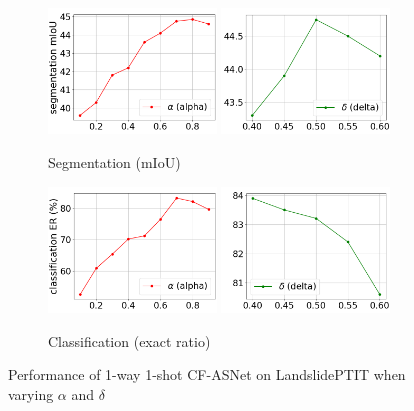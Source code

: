 \documentclass{ieeeaccess}
\begin{document}
\begin{figure}
  \centering
  \begin{subfigure}{\columnwidth}
  \includegraphics[width=0.49\textwidth]{Fig/alpha_iou_3.png}
  \includegraphics[width=0.49\textwidth]{Fig/delta_iou.png}
  \caption{Segmentation (mIoU)}
  \label{fig:alpha-a}
  \end{subfigure}
  \hfill
  \begin{subfigure}{\columnwidth}
  \includegraphics[width=0.49\textwidth]{Fig/alpha_er_3.png}
  \includegraphics[width=0.49\textwidth]{Fig/delta_er.png}
  \caption{Classification (exact ratio)}
  \label{fig:alpha-b}
  \end{subfigure}
  \caption{Performance of 1-way 1-shot CF-ASNet on LandslidePTIT when varying $\alpha$ and $\delta$}
  \label{fig:alpha}
\end{figure}
\end{document}
